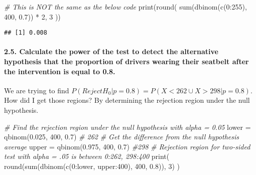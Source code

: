 \documentclass[
]{article}
\newenvironment{Shaded}{\begin{snugshade}}{\end{snugshade}}
\newcommand{\CommentTok}[1]{\textcolor[rgb]{0.56,0.35,0.01}{\textit{#1}}}
\newcommand{\DecValTok}[1]{\textcolor[rgb]{0.00,0.00,0.81}{#1}}
\newcommand{\FloatTok}[1]{\textcolor[rgb]{0.00,0.00,0.81}{#1}}
\newcommand{\FunctionTok}[1]{\textcolor[rgb]{0.00,0.00,0.00}{#1}}
\newcommand{\NormalTok}[1]{#1}
\newcommand{\OtherTok}[1]{\textcolor[rgb]{0.56,0.35,0.01}{#1}}
\newcommand{\SpecialCharTok}[1]{\textcolor[rgb]{0.00,0.00,0.00}{#1}}
\begin{document}
\begin{Shaded}
\begin{Highlighting}[]
\CommentTok{\# This is NOT the same as the below code}
\FunctionTok{print}\NormalTok{(}\FunctionTok{round}\NormalTok{(}
  \FunctionTok{sum}\NormalTok{(}\FunctionTok{dbinom}\NormalTok{(}\FunctionTok{c}\NormalTok{(}\DecValTok{0}\SpecialCharTok{:}\DecValTok{255}\NormalTok{), }\DecValTok{400}\NormalTok{, }\FloatTok{0.7}\NormalTok{)) }\SpecialCharTok{*} \DecValTok{2}\NormalTok{, }\DecValTok{3}
\NormalTok{))}
\end{Highlighting}
\end{Shaded}

\begin{verbatim}
## [1] 0.008
\end{verbatim}

\hypertarget{calculate-the-power-of-the-test-to-detect-the-alternative-hypothesis-that-the-proportion-of-drivers-wearing-their-seatbelt-after-the-intervention-is-equal-to-0.8.}{%
\paragraph{2.5. Calculate the power of the test to detect the
alternative hypothesis that the proportion of drivers wearing their
seatbelt after the intervention is equal to
0.8.}\label{calculate-the-power-of-the-test-to-detect-the-alternative-hypothesis-that-the-proportion-of-drivers-wearing-their-seatbelt-after-the-intervention-is-equal-to-0.8.}}

We are trying to find
\(P(Reject H_0 | p = 0.8)=P(X<262 \cup X >298|p=0.8)\).\\
How did I get those regions? By determining the rejection region under
the null hypothesis.

\begin{Shaded}
\begin{Highlighting}[]
\CommentTok{\# Find the rejection region under the null hypothesis with alpha = 0.05}
\NormalTok{lower }\OtherTok{=} \FunctionTok{qbinom}\NormalTok{(}\FloatTok{0.025}\NormalTok{, }\DecValTok{400}\NormalTok{, }\FloatTok{0.7}\NormalTok{) }\CommentTok{\# 262}
\CommentTok{\# Get the difference from the null hypothesis average}
\NormalTok{upper }\OtherTok{=} \FunctionTok{qbinom}\NormalTok{(}\FloatTok{0.975}\NormalTok{, }\DecValTok{400}\NormalTok{, }\FloatTok{0.7}\NormalTok{) }\CommentTok{\#298}
\CommentTok{\# Rejection region for two{-}sided test with alpha = .05 is between 0:262, 298:400}
\FunctionTok{print}\NormalTok{(}
  \FunctionTok{round}\NormalTok{(}\FunctionTok{sum}\NormalTok{(}\FunctionTok{dbinom}\NormalTok{(}\FunctionTok{c}\NormalTok{(}\DecValTok{0}\SpecialCharTok{:}\NormalTok{lower, upper}\SpecialCharTok{:}\DecValTok{400}\NormalTok{), }\DecValTok{400}\NormalTok{, }\FloatTok{0.8}\NormalTok{)), }\DecValTok{3}\NormalTok{)}
\NormalTok{)}
\end{Highlighting}
\end{Shaded}
\end{document}
